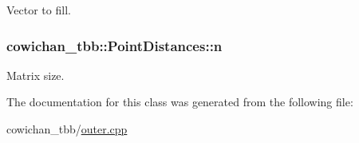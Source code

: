 Vector to fill. \hypertarget{classcowichan__tbb_1_1_point_distances_623f4224db7a141a9f376e8c5bc51b03}{
\subsubsection[{n}]{ {\bf cowichan\_\-tbb::PointDistances::n}}}
\label{classcowichan__tbb_1_1_point_distances_623f4224db7a141a9f376e8c5bc51b03}


Matrix size. 

The documentation for this class was generated from the following file:\begin{CompactItemize}
\item 
cowichan\_\-tbb/\hyperlink{cowichan__tbb_2outer_8cpp}{outer.cpp}\end{CompactItemize}
